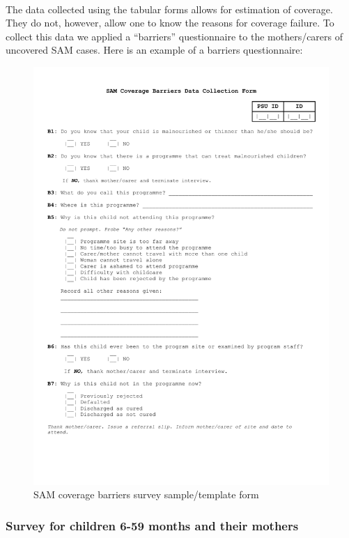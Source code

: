\documentclass[12pt,a4paper]{article}
\begin{document}
~

The data collected using the tabular forms allows for estimation of coverage. They do not, however, allow one to know the reasons for coverage failure. To collect this data we applied a ``barriers'' questionnaire to the mothers/carers of uncovered SAM cases. Here is an example of a barriers questionnaire:

\newpage

\begin{figure}[H]

{\centering \includegraphics[width=0.9\linewidth]{forms/samBarriersForm} 

}

\caption{SAM coverage barriers survey sample/template form}\label{fig:sambarriers}
\end{figure}

\newpage

\hypertarget{survey-for-children-6-59-months-and-their-mothers}{%
\subsubsection{Survey for children 6-59 months and their mothers}\label{survey-for-children-6-59-months-and-their-mothers}}
\end{document}
